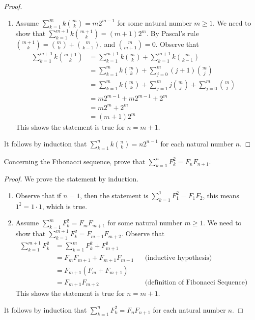 \documentclass[DIN, pagenumber=false, fontsize=11pt, parskip=half]{scrartcl}
\begin{document}
\begin{problems}
\begin{proof}
\begin{enumerate}
            \item Assume $\sum\limits_{k=1}^{m} k\binom{m}{k} = m2^{m-1}$ for some natural number $m \geq 1$.
                We need to show that $\sum\limits_{k=1}^{m+1} k\binom{m+1}{k} = (m+1)2^m$.
                By Pascal's rule $\binom{m+1}{k} = \binom{m}{k} + \binom{m}{k-1}$, and $\binom{m}{m+1} = 0$.
                Observe that
                \begin{align*}
                    \sum_{k=1}^{m+1} k\binom{m+1}{k}
                    & = \sum_{k=1}^{m+1} k\binom{m}{k} + \sum_{k=1}^{m+1} k\binom{m}{k-1}\\
                    & = \sum_{k=1}^{m} k\binom{m}{k} + \sum_{j=0}^{m} (j+1)\binom{m}{j}\\
                    & = \sum_{k=1}^{m} k\binom{m}{k} + \sum_{j=1}^{m} j\binom{m}{j} + \sum_{j=0}^{m} \binom{m}{j}\\ 
                    & = m2^{m-1} + m2^{m-1} + 2^m\\
                    & = m2^m + 2^m\\
                    & = (m+1)2^m
                \end{align*}
                This shows the statement is true for $n = m+1$.
        \end{enumerate}
        It follows by induction that $\sum\limits_{k=1}^{n} k\binom{n}{k} = n2^{n-1}$ for each natural number $n$.
    \end{proof}

    \problem Concerning the Fibonacci sequence, prove that $\sum\limits_{k=1}^{n}F_k^2 = F_nF_{n+1}$.
    \begin{proof}
        We prove the statement by induction.
        \begin{enumerate}
            \item Observe that if $n=1$, then the statement is $\sum\limits_{k=1}^{1}F_1^2 = F_1F_{2}$, this means $1^2 = 1 \cdot 1$, which is true.

            \item Assume $\sum\limits_{k=1}^{m}F_k^2 = F_mF_{m+1}$ for some natural number $m \geq 1$. We need to show that $\sum\limits_{k=1}^{m+1}F_k^2 = F_{m+1}F_{m+2}$. Observe that
                \begin{align*}
                    \sum\limits_{k=1}^{m+1}F_k^2 &= \sum\limits_{k=1}^{m}F_k^2 + F_{m+1}^2\\ 
                                                 &= F_mF_{m+1} + F_{m+1}F_{m+1} && \text{(inductive hypothesis)}\\ 
                                                 &= F_{m+1}(F_{m}+F_{m+1})\\ 
                                                 &= F_{m+1}F_{m+2} && \text{(definition of Fibonacci Sequence)}
                \end{align*}
                This shows the statement is true for $n = m + 1$.
        \end{enumerate}
        It follows by induction that $\sum\limits_{k=1}^{n}F_k^2 = F_nF_{n+1}$ for each natural number $n$.
    \end{proof}


\end{problems}
\end{document}
